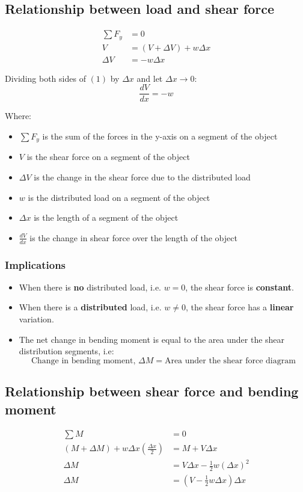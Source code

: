 \documentclass[11pt]{article}
\begin{document}
\subsection{Relationship between load and shear force}
\label{sec:org0a60112}
\begin{align*}
\sum F_y &= 0 \\
V &= (V + \Delta V) + w \Delta x \\
\Delta V &= -w \Delta x \tag{1}
\end{align*}

Dividing both sides of \((1)\) by \(\Delta x\) and let \(\Delta x \rightarrow 0\):
\[\frac{dV}{dx} = -w\]

Where:
\begin{itemize}
\item \(\sum F_y\) is the sum of the forces in the y-axis on a segment of the object
\item \(V\) is the shear force on a segment of the object
\item \(\Delta V\) is the change in the shear force due to the distributed load
\item \(w\) is the distributed load on a segment of the object
\item \(\Delta x\) is the length of a segment of the object
\item \(\frac{dV}{dx}\) is the change in shear force over the length of the object
\end{itemize}

\subsubsection{Implications}
\label{sec:org720d7be}
\begin{itemize}
\item When there is \textbf{no} distributed load, i.e. \(w = 0\), the shear force is \textbf{constant}.
\item When there is a \textbf{distributed} load, i.e. \(w \ne 0\), the shear force has a \textbf{linear} variation.
\item The net change in bending moment is equal to the area under the shear distribution segments, i.e:
\[\text{Change in bending moment, } \Delta M = \text{Area under the shear force diagram}\]
\end{itemize}

\subsection{Relationship between shear force and bending moment}
\label{sec:org0daafce}
\begin{align*}
\sum M &= 0 \\
(M + \Delta M) + w \Delta x \left(\frac{\Delta x}{2} \right) &= M + V \Delta x \\
\Delta M &= V \Delta x - \frac{1}{2}w\left(\Delta x \right)^2 \\
\Delta M &= (V - \frac{1}{2} w \Delta x) \Delta x \tag{2}
\end{align*}
\end{document}
